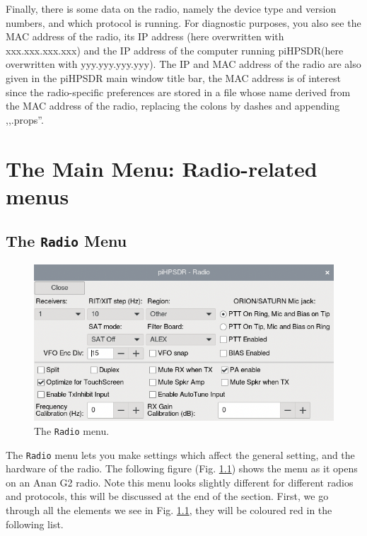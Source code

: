 \documentclass[12pt]{book}
\def\bltt#1{\texttt{\color{blue}#1}}
\def\pH{pi\-HPSDR\xspace}
\begin{document}
Finally, there is
some data on the radio, namely the device type and version numbers, and which protocol is running.
For diagnostic purposes, you also see the MAC address of the radio, its IP address (here overwritten
with xxx.xxx.xxx.xxx)
and the
IP address of the computer running \pH (here overwritten with yyy.yyy.yyy.yyy). The IP and MAC address of
the radio are also given in the \pH main window title bar, the MAC address is of interest since the radio-specific
preferences are stored in a file whose name derived from the MAC address of the radio, replacing
the colons by dashes and appending ,,.props''.
\chapter[Radio-related menus]{The Main Menu: Radio-related menus}
\section{The \texttt{Radio} Menu}

\begin{figure}[ht]
\center
\includegraphics[scale=0.45]{RadioMenu.png}
\caption{The \bltt{Radio} menu.}
\label{fig:RadioMenu}
\end{figure}


The \bltt{Radio} menu lets you make settings which affect the general setting, and the hardware of the
radio.
The following figure (Fig. \ref{fig:RadioMenu}) shows the menu as it opens on an Anan G2 radio.
Note this menu looks slightly different for different radios and protocols, this will be discussed
at the end of the section. First, we go through all the elements we see in Fig. \ref{fig:RadioMenu},
they will be coloured red in the following list.
\end{document}
